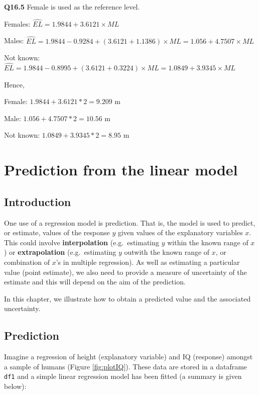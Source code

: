 \documentclass[
  oneside]{krantz}
\begin{document}
\textbf{Q16.5} Female is used as the reference level.

Females: \(\hat{EL}=1.9844+3.6121 \times ML\)

Males: \(\hat{EL}=1.9844-0.9284+\left(3.6121+1.1386\right)\times ML=1.056+4.7507\times ML\)

Not known:\(\hat{EL}=1.9844-0.8995+\left(3.6121+0.3224\right)\times ML=1.0849+3.9345\times ML\)

Hence,

Female: \(1.9844 + 3.6121 * 2 = 9.209\) m

Male: \(1.056 + 4.7507 * 2 = 10.56\) m

Not known: \(1.0849 + 3.9345 * 2 = 8.95\) m

\hypertarget{prediction}{%
\chapter{Prediction from the linear model}\label{prediction}}

\hypertarget{INTpred}{%
\section{Introduction}\label{INTpred}}

One use of a regression model is prediction. That is, the model is used to predict, or estimate, values of the response \(y\) given values of the explanatory variables \(x\). This could involve \textbf{interpolation} (e.g.~estimating \(y\) within the known range of \(x\)) or \textbf{extrapolation} (e.g.~estimating \(y\) outwith the known range of \(x\), or combination of \(x\)'s in multiple regression). As well as estimating a particular value (point estimate), we also need to provide a measure of uncertainty of the estimate and this will depend on the aim of the prediction.

In this chapter, we illustrate how to obtain a predicted value and the associated uncertainty.

\hypertarget{prediction-1}{%
\section{Prediction}\label{prediction-1}}

Imagine a regression of height (explanatory variable) and IQ (response) amongst a sample of humans (Figure \ref{fig:plotIQ}). These data are stored in a dataframe \texttt{df1} and a simple linear regression model has been fitted (a summary is given below):
\end{document}
